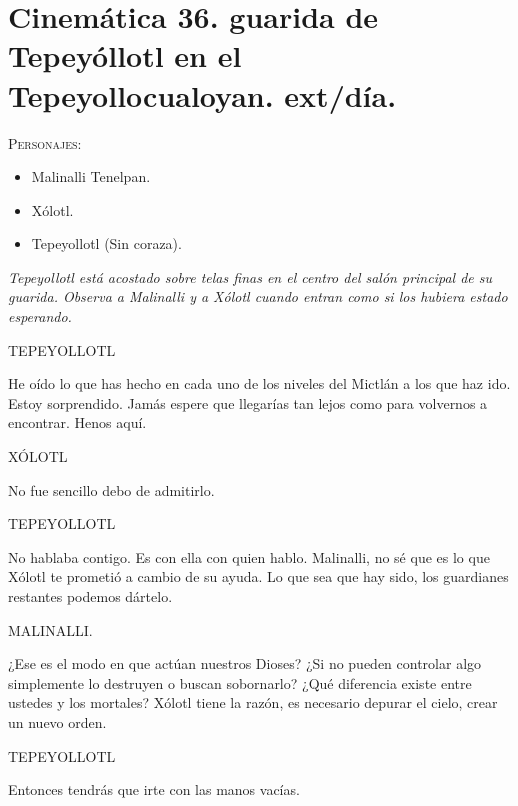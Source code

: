\documentclass[11pt,letterpaper]{article}
\begin{document}
\section{Cinemática 36. guarida de Tepeyóllotl en el Tepeyollocualoyan. ext/día. }
 \textsc{Personajes}:
 \begin{itemize}
 \item Malinalli Tenelpan.
 \item Xólotl.
 \item Tepeyollotl (Sin coraza).
 \end{itemize}
\textit{Tepeyollotl está acostado sobre telas finas en el centro del salón principal de su guarida. Observa a Malinalli y a Xólotl cuando entran como si los hubiera estado esperando.}
\begin{center}
TEPEYOLLOTL
\\
\par
He oído lo que has hecho en cada uno de los niveles del Mictlán a los que haz ido. Estoy sorprendido. Jamás espere que llegarías tan lejos como para volvernos a encontrar. Henos aquí.
\\
\par
XÓLOTL
\\
\par
No fue sencillo debo de admitirlo.
\\
\par
TEPEYOLLOTL
\\
\par
No hablaba contigo. Es con ella con quien hablo. Malinalli, no sé que es lo que Xólotl te prometió a cambio de su ayuda. Lo que sea que hay sido, los guardianes restantes podemos dártelo. 
\\
\par
MALINALLI.
\\
\par
¿Ese es el modo en que actúan nuestros Dioses? ¿Si no pueden controlar algo simplemente lo destruyen o buscan sobornarlo? ¿Qué diferencia existe entre ustedes y los mortales? Xólotl tiene la razón, es necesario depurar el cielo, crear un nuevo orden.
\\
\par
TEPEYOLLOTL
\\
\par
Entonces tendrás que irte con las manos vacías.
\end{center}
\end{document}
